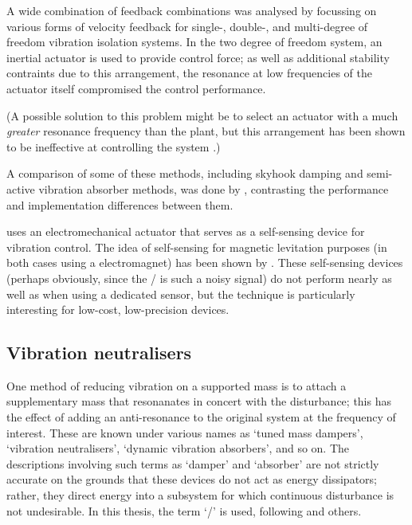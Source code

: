 A wide combination of feedback combinations was analysed by \textcite{diaz2005} focussing on various forms of velocity feedback for single-, double-, and multi-degree of freedom vibration isolation systems.
In the two degree of freedom system, an inertial actuator is used to provide control force; as well as additional stability contraints due to this arrangement, the resonance at low frequencies of the actuator itself compromised the control performance.

(A possible solution to this problem might be to select an actuator with a much \emph{greater} resonance frequency than the plant, but this arrangement has been shown to be ineffective at controlling the system \cite[][Appendix~A]{benassi2002}.)

A comparison of some of these methods, including skyhook damping and semi-active vibration absorber methods, was done by \textcite{huyanan2007}, contrasting the performance and implementation differences between them.

\textcite{paulitsch2003} uses an electromechanical actuator that serves as a self-sensing device for vibration control.
The idea of self-sensing for magnetic levitation purposes (in both cases using a electromagnet) has been shown by \textcite{bleuler1992,vischer1993}.
These self-sensing devices (perhaps obviously, since the \backemf/ is such a noisy signal) do not perform nearly as well as when using a dedicated sensor, but the technique is particularly interesting for low-cost, low-precision devices.



\subsection{Vibration neutralisers}

One method of reducing vibration on a supported mass is to attach a
supplementary mass that resonanates in concert with the disturbance; this has
the effect of adding an anti-resonance to the original system at the frequency
of interest.
These are known under various names as `tuned mass dampers',
`vibration neutralisers', `dynamic vibration absorbers', and so on.
The descriptions
involving such terms as `damper' and `absorber' are not strictly accurate on
the grounds that these devices do not act as energy dissipators; rather, they
direct energy into a subsystem for which continuous disturbance is not
undesirable.
In this thesis, the term `\vibneut/' is used, following
\textcite{kidner1998} and others.

